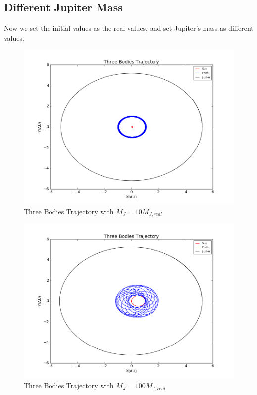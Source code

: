 \documentclass[10pt,a4paper]{article}
\begin{document}
    \subsection{Different Jupiter Mass}
    Now we set the initial values as the real values, and set Jupiter's mass as different values.\\
    \begin{figure}[htbp]
    	\centering
    	\includegraphics[width=5in]{threebodies_5.png}
    	\caption{Three Bodies Trajectory with $M_J=10M_{J,real}$}
    \end{figure}
    \begin{figure}[htbp]
    		\centering
    		\includegraphics[width=5in]{threebodies_6.png}
    		\caption{Three Bodies Trajectory with $M_J=100M_{J,real}$}
    \end{figure}
\end{document}
